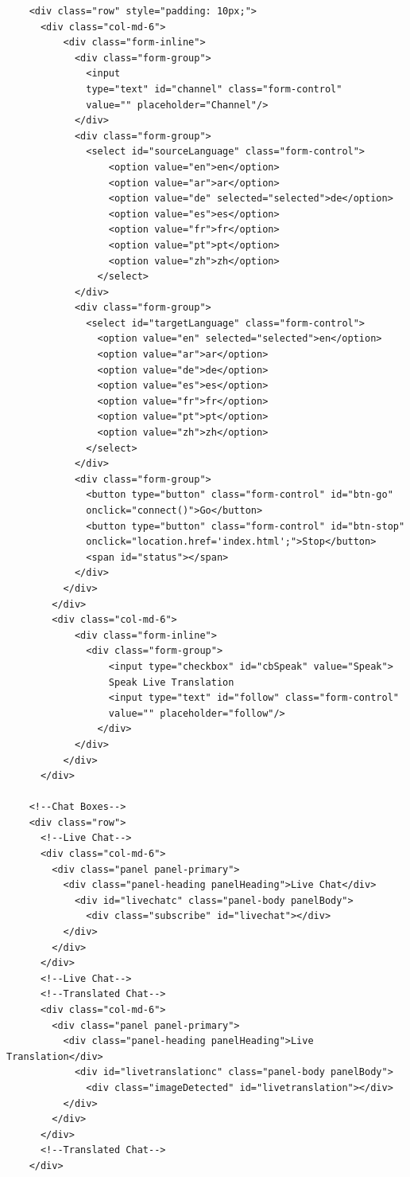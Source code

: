\documentclass[runningheads]{llncs}
\begin{document}
{\begin{verbatim}
    <div class="row" style="padding: 10px;">
      <div class="col-md-6">
          <div class="form-inline">
            <div class="form-group">
              <input 
              type="text" id="channel" class="form-control" 
              value="" placeholder="Channel"/>
            </div>
            <div class="form-group">
              <select id="sourceLanguage" class="form-control">
                  <option value="en">en</option>
                  <option value="ar">ar</option>
                  <option value="de" selected="selected">de</option>
                  <option value="es">es</option>
                  <option value="fr">fr</option>
                  <option value="pt">pt</option>
                  <option value="zh">zh</option>
                </select>
            </div>
            <div class="form-group">
              <select id="targetLanguage" class="form-control">
                <option value="en" selected="selected">en</option>
                <option value="ar">ar</option>
                <option value="de">de</option>
                <option value="es">es</option>
                <option value="fr">fr</option>
                <option value="pt">pt</option>
                <option value="zh">zh</option>
              </select>
            </div>
            <div class="form-group">
              <button type="button" class="form-control" id="btn-go" 
              onclick="connect()">Go</button>
              <button type="button" class="form-control" id="btn-stop"
              onclick="location.href='index.html';">Stop</button>
              <span id="status"></span>
            </div>
          </div>
        </div>
        <div class="col-md-6">
            <div class="form-inline">
              <div class="form-group">
                  <input type="checkbox" id="cbSpeak" value="Speak"> 
                  Speak Live Translation
                  <input type="text" id="follow" class="form-control" 
                  value="" placeholder="follow"/>
                </div>
            </div>
          </div>
      </div>

    <!--Chat Boxes-->
    <div class="row">
      <!--Live Chat-->
      <div class="col-md-6">
        <div class="panel panel-primary">
          <div class="panel-heading panelHeading">Live Chat</div>
            <div id="livechatc" class="panel-body panelBody">
              <div class="subscribe" id="livechat"></div>
          </div>
        </div>
      </div>
      <!--Live Chat-->
      <!--Translated Chat-->
      <div class="col-md-6">
        <div class="panel panel-primary">
          <div class="panel-heading panelHeading">Live Translation</div>
            <div id="livetranslationc" class="panel-body panelBody">
              <div class="imageDetected" id="livetranslation"></div>
          </div>
        </div>
      </div>
      <!--Translated Chat-->
    </div>


\end{verbatim}}
\end{document}
